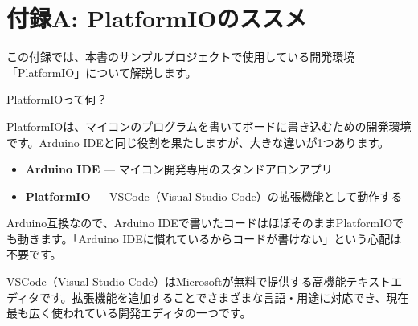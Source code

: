 \section*{付録A: PlatformIOのススメ}
\label{sec:appendix_platformio}

この付録では、本書のサンプルプロジェクトで使用している開発環境「PlatformIO」について解説します。

\begin{qabox}{PlatformIOって何？}

PlatformIOは、マイコンのプログラムを書いてボードに書き込むための開発環境です。Arduino IDEと同じ役割を果たしますが、大きな違いが1つあります。

\begin{itemize}
  \item \textbf{Arduino IDE} — マイコン開発専用のスタンドアロンアプリ
  \item \textbf{PlatformIO} — VSCode（Visual Studio Code）の拡張機能として動作する
\end{itemize}

Arduino互換なので、Arduino IDEで書いたコードはほぼそのままPlatformIOでも動きます。「Arduino IDEに慣れているからコードが書けない」という心配は不要です。

\begin{notebox}[VSCodeとは]
VSCode（Visual Studio Code）はMicrosoftが無料で提供する高機能テキストエディタです。拡張機能を追加することでさまざまな言語・用途に対応でき、現在最も広く使われている開発エディタの一つです。
\end{notebox}

\end{qabox}

